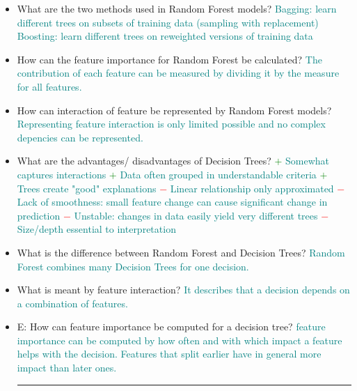 \documentclass{report}
\newcommand{\asw}[2][teal]{}
\renewcommand{\asw}[2][teal]{\textcolor{#1}{#2}}
\begin{document}
\begin{itemize}
		\item What are the two methods used in Random Forest models?
		\asw{\newline Bagging: learn different trees on subsets of training data (sampling with replacement)
			\newline Boosting: learn different trees on reweighted versions of training data}
		\item How can the feature importance for Random Forest be calculated?
		\asw{\newline The contribution of each feature can be measured by dividing it by the measure for all features.}
		\item How can interaction of feature be represented by Random Forest models?
		\asw{\newline Representing feature interaction is only limited possible and no complex depencies can be represented.}
		\item What are the advantages/ disadvantages of Decision Trees?
		\asw{\newline \textcolor{green}{$+$} Somewhat captures interactions
			\newline \textcolor{green}{$+$} Data often grouped in understandable criteria
			\newline \textcolor{green}{$+$} Trees create "good" explanations
			\newline \textcolor{red}{$-$} Linear relationship only approximated
			\newline \textcolor{red}{$-$} Lack of smoothness: small feature change can cause significant change in prediction
			\newline \textcolor{red}{$-$} Unstable: changes in data easily yield very different trees
			\newline \textcolor{red}{$-$} Size/depth essential to interpretation}
		\item What is the difference between Random Forest and Decision Trees?
		\asw{\newline Random Forest combines many Decision Trees for one decision.}
		\item What is meant by feature interaction?
		\asw{\newline It describes that a decision depends on a combination of features.}
		\item E: How can feature importance be computed for a decision tree?
		\asw{\newline feature importance can be computed by how often and with which impact a feature helps with the decision. Features that split earlier have in general more impact than later ones.}
		\newline
		\hrule 
		

\end{itemize}
\end{document}
